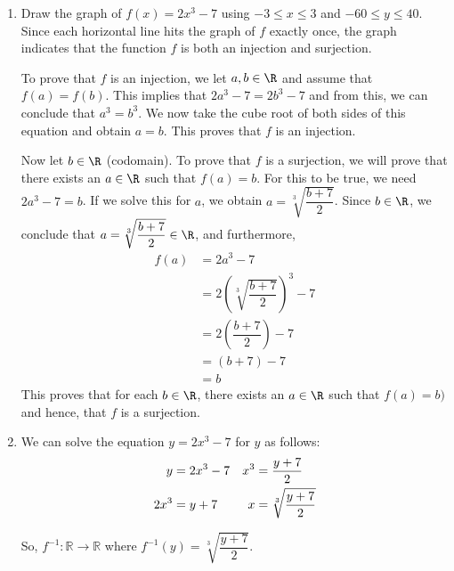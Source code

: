 \documentclass[11pt]{article}
\begin{document}
\begin{enumerate}
\item Draw the graph of $f \left( x \right) = 2x^3 - 7$ using $-3 \leq x \leq 3$ and 
$-60 \leq y \leq 40$.  Since each horizontal line hits the graph of  $f$  exactly once, the graph indicates that the function  $f$  is both an injection and surjection.

\newpar
To prove that $f$ is an injection, we let $a, b \in \R$ and assume that $f(a) = f(b)$.  This implies that 
$2a^3 - 7 = 2b^3 - 7$ and from this, we can conclude that $a^3 = b^3$.  We now take the cube root of both sides of this equation and obtain $a = b$.  This proves that $f$ is an injection.

\newpar
Now let $b \in \R$ (codomain).  To prove that $f$ is a surjection, we will prove that there exists an $a \in \R$ such that $f(a) = b$.  For this to be true, we need $2a^3 - 7 = b$.  If we solve this for $a$, we obtain 
$a = \sqrt[3]{\dfrac{b + 7}{2}}$.  Since $b \in \R$, we conclude that $a = \sqrt[3]{\dfrac{b + 7}{2}} \in \R$, and furthermore,
\begin{align*}
f(a) &= 2a^3 - 7 \\
     &= 2 \left( \sqrt[3]{\dfrac{b + 7}{2}} \right)^3 - 7 \\
     &= 2 \left( \dfrac{b + 7}{2} \right) - 7 \\
     &= (b + 7) - 7 \\
     &= b
\end{align*}
This proves that for each $b \in \R$, there exists an $a \in \R$ such that $f(a) = b)$ and hence, that $f$ is a surjection.


\item We can solve the equation $y = 2x^3 - 7$ for $y$ as follows:
\begin{align}
  y &= 2x^3  - 7  &  x^3  &= \frac{{y + 7}}{2} \notag \\
2x^3 &= y + 7     &    x &= \sqrt[3]{{\frac{{y + 7}}{2}}} \notag
\end{align}

So,  $f^{ - 1} :\mathbb{R} \to \mathbb{R}$ where  
$f^{ - 1} \left( y \right) = \sqrt[3]{{\dfrac{{y + 7}}{2}}}$.


\end{enumerate}
\end{document}
